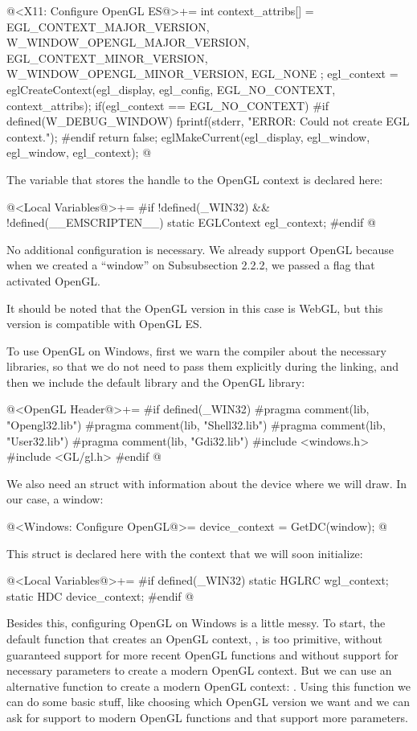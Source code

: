 \iniciocodigo
@<X11: Configure OpenGL ES@>+=
{
  int context_attribs[] = {
    EGL_CONTEXT_MAJOR_VERSION, W_WINDOW_OPENGL_MAJOR_VERSION,
    EGL_CONTEXT_MINOR_VERSION, W_WINDOW_OPENGL_MINOR_VERSION,
    EGL_NONE
  };
  egl_context = eglCreateContext(egl_display, egl_config,
                                 EGL_NO_CONTEXT, context_attribs);
  if(egl_context == EGL_NO_CONTEXT){
#if defined(W_DEBUG_WINDOW)
    fprintf(stderr, "ERROR: Could not create EGL context.\n");
#endif
    return false;
  }
  eglMakeCurrent(egl_display, egl_window, egl_window, egl_context);
}
@
\fimcodigo

The variable that stores the handle to the OpenGL context is declared
here:

\iniciocodigo
@<Local Variables@>+=
#if !defined(_WIN32) && !defined(__EMSCRIPTEN__)
static EGLContext egl_context;
#endif
@
\fimcodigo


No additional configuration is necessary. We already support OpenGL
because when we created a ``window'' on Subsubsection 2.2.2, we passed
a flag that activated OpenGL.

It should be noted that the OpenGL version in this case is WebGL, but
this version is compatible with OpenGL ES.


To use OpenGL on Windows, first we warn the compiler about the
necessary libraries, so that we do not need to pass them explicitly
during the linking, and then we include the default library and the
OpenGL library:

\iniciocodigo
@<OpenGL Header@>+=
#if defined(_WIN32)
#pragma comment(lib, "Opengl32.lib")
#pragma comment(lib, "Shell32.lib")
#pragma comment(lib, "User32.lib")
#pragma comment(lib, "Gdi32.lib")
#include <windows.h>
#include <GL/gl.h>
#endif
@
\fimcodigo

We also need an struct with information about the device where we will
draw. In our case, a window:

\iniciocodigo
@<Windows: Configure OpenGL@>=
device_context = GetDC(window);
@
\fimcodigo

This struct is declared here with the context that we will soon initialize:

\iniciocodigo
@<Local Variables@>+=
#if defined(_WIN32)
static HGLRC wgl_context;
static HDC device_context;
#endif
@
\fimcodigo

Besides this, configuring OpenGL on Windows is a little messy. To
start, the default function that creates an OpenGL
context, , is too primitive, without
guaranteed support for more recent OpenGL functions and without
support for necessary parameters to create a modern OpenGL
context. But we can use an alternative function to create a modern
OpenGL context: . Using this
function we can do some basic stuff, like choosing which OpenGL
version we want and we can ask for support to modern OpenGL functions
and that support more parameters.

